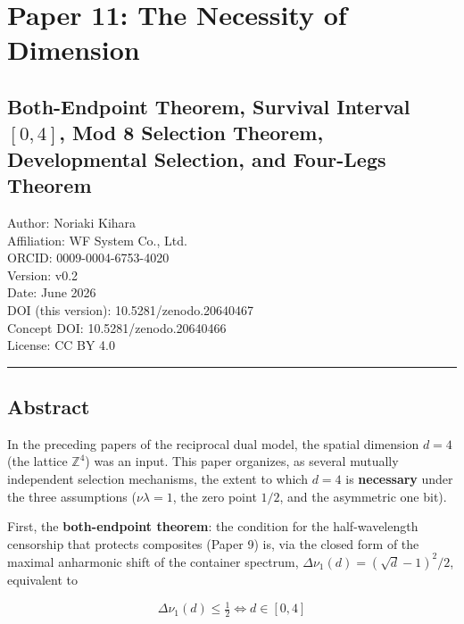 \documentclass[
]{article}
\author{}
\date{}
\begin{document}
\section{Paper 11: The Necessity of
Dimension}\label{paper-11-the-necessity-of-dimension}

\subsection{\texorpdfstring{Both-Endpoint Theorem, Survival Interval
\([0,4]\), Mod 8 Selection Theorem, Developmental Selection, and
Four-Legs
Theorem}{Both-Endpoint Theorem, Survival Interval {[}0,4{]}, Mod 8 Selection Theorem, Developmental Selection, and Four-Legs Theorem}}\label{both-endpoint-theorem-survival-interval-04-mod-8-selection-theorem-developmental-selection-and-four-legs-theorem}

Author: Noriaki Kihara\\
Affiliation: WF System Co., Ltd.\\
ORCID: 0009-0004-6753-4020\\
Version: v0.2\\
Date: June 2026\\
DOI (this version): 10.5281/zenodo.20640467\\
Concept DOI: 10.5281/zenodo.20640466\\
License: CC BY 4.0

\begin{center}\rule{0.5\linewidth}{0.5pt}\end{center}

\subsection{Abstract}\label{abstract}

In the preceding papers of the reciprocal dual model, the spatial
dimension \(d=4\) (the lattice \(\mathbb{Z}^4\)) was an input. This
paper organizes, as several mutually independent selection mechanisms,
the extent to which \(d=4\) is \textbf{necessary} under the three
assumptions (\(\nu\lambda=1\), the zero point \(1/2\), and the
asymmetric one bit).

First, the \textbf{both-endpoint theorem}: the condition for the
half-wavelength censorship that protects composites (Paper 9) is, via
the closed form of the maximal anharmonic shift of the container
spectrum, \(\Delta\nu_1(d)=(\sqrt d-1)^2/2\), equivalent to

\[
\Delta\nu_1(d)\le\tfrac12\iff d\in[0,4]
\]
\end{document}

